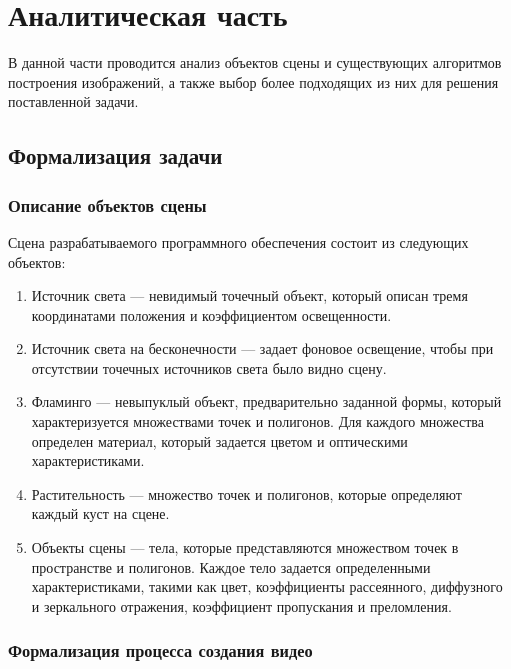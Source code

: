 \chapter{Аналитическая часть}

В данной части проводится анализ объектов сцены и существующих алгоритмов построения изображений, а также выбор более подходящих из них для решения поставленной задачи.

\section{Формализация задачи}

\subsection{Описание объектов сцены}

Сцена разрабатываемого программного обеспечения состоит из следующих объектов:
\begin{enumerate}[label=\arabic*)]
	\item Источник света --- невидимый точечный объект, который описан тремя координатами положения и коэффициентом освещенности.
	\item Источник света на бесконечности --- задает фоновое освещение, чтобы при отсутствии точечных источников света было видно сцену.
	\item Фламинго --- невыпуклый объект, предварительно заданной формы, который характеризуется множествами точек и полигонов. Для каждого множества определен материал, который задается цветом и оптическими характеристиками.
	\item Растительность --- множество точек и полигонов, которые определяют каждый куст на сцене.
	\item Объекты сцены --- тела, которые представляются множеством точек в пространстве и полигонов. Каждое тело задается определенными характеристиками, такими как цвет, коэффициенты рассеянного, диффузного и зеркального отражения, коэффициент пропускания и преломления.
\end{enumerate} 

\subsection{Формализация процесса создания видео}

